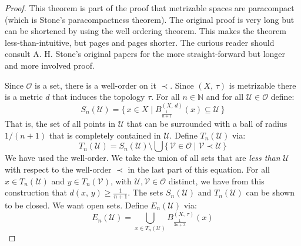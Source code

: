 \documentclass{article}
\theoremstyle{plain}
\theoremstyle{normal}
\begin{document}
        \begin{proof}
            This theorem is part of the proof that metrizable spaces are
            paracompact (which is Stone's paracompactness theorem). The
            original proof is very long but can be shortened by using the
            well ordering theorem. This makes the theorem less-than-intuitive,
            but pages and pages shorter. The curious reader should consult
            A. H. Stone's original papers for the more straight-forward but
            longer and more involved proof.
            \par\hfill\par
            Since $\mathcal{O}$ is a set, there is a well-order on it
            $\prec$. Since $(X,\,\tau)$ is metrizable there is a metric
            $d$ that induces the topology $\tau$. For all $n\in\mathbb{N}$
            and for all $\mathcal{U}\in\mathcal{O}$ define:
            \begin{equation}
                S_{n}(\mathcal{U})=
                \{\,x\in{X}\;|\;
                    {B}_{\frac{1}{n+1}}^{(X,\,d)}(x)\subseteq\mathcal{U}\,\}
            \end{equation}
            That is, the set of all points in $\mathcal{U}$ that can be
            surrounded with a ball of radius $1/(n+1)$ that is completely
            contained in $\mathcal{U}$. Define $T_{n}(\mathcal{U})$ via:
            \begin{equation}
                T_{n}(\mathcal{U})=
                S_{n}(\mathcal{U})\setminus\bigcup
                    \big\{\,\mathcal{V}\in\mathcal{O}\;|\;
                        \mathcal{V}\prec\mathcal{U}\,\big\}
            \end{equation}
            We have used the well-order. We take the union of all sets that are
            \textit{less than} $\mathcal{U}$ with respect to the well-order
            $\prec$ in the last part of this equation. For all
            $x\in{T}_{n}(\mathcal{U})$ and $y\in{T}_{n}(\mathcal{V})$, with
            $\mathcal{U},\mathcal{V}\in\mathcal{O}$ distinct, we have from this
            construction that $d(x,\,y)\geq\frac{1}{n+1}$. The sets
            $S_{n}(\mathcal{U})$ and $T_{n}(\mathcal{U})$ can be shown to be
            closed. We want open sets. Define $E_{n}(\mathcal{U})$ via:
            \begin{equation}
                E_{n}(\mathcal{U})=
                \bigcup_{x\in{T}_{n}(\mathcal{U})}
                B_{\frac{1}{3n+3}}^{(X,\,\tau)}(x)
            \end{equation}

\end{proof}
\end{document}
